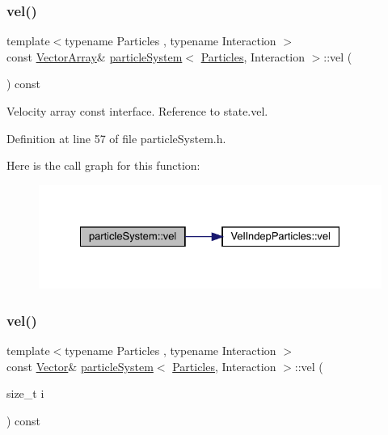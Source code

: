 \subsubsection{\texorpdfstring{vel()}{vel()}\hspace{0.1cm}{\footnotesize\ttfamily [1/2]}}
{\footnotesize\ttfamily template$<$typename Particles , typename Interaction $>$ \\
const \mbox{\hyperlink{classparticle_system_ac8049667a0d05e76b836642503a71c12}{Vector\+Array}}\& \mbox{\hyperlink{classparticle_system}{particle\+System}}$<$ \mbox{\hyperlink{struct_particles}{Particles}}, Interaction $>$\+::vel (\begin{DoxyParamCaption}{ }\end{DoxyParamCaption}) const\hspace{0.3cm}{\ttfamily [inline]}}



Velocity array const interface. Reference to state.\+vel. 



Definition at line 57 of file particle\+System.\+h.

Here is the call graph for this function\+:\nopagebreak
\begin{figure}[H]
\begin{center}
\leavevmode
\includegraphics[width=328pt]{classparticle_system_a4609f37fb9055bc71f14dbf6738017ba_cgraph}
\end{center}
\end{figure}
\mbox{\label{classparticle_system_a2557b0120e0e892da7e8903551784157}} 
\subsubsection{\texorpdfstring{vel()}{vel()}\hspace{0.1cm}{\footnotesize\ttfamily [2/2]}}
{\footnotesize\ttfamily template$<$typename Particles , typename Interaction $>$ \\
const \mbox{\hyperlink{classparticle_system_a76c99c2b05db108a24c6e6ccbbd93af1}{Vector}}\& \mbox{\hyperlink{classparticle_system}{particle\+System}}$<$ \mbox{\hyperlink{struct_particles}{Particles}}, Interaction $>$\+::vel (\begin{DoxyParamCaption}\item[{size\+\_\+t}]{i }\end{DoxyParamCaption}) const\hspace{0.3cm}{\ttfamily [inline]}}



